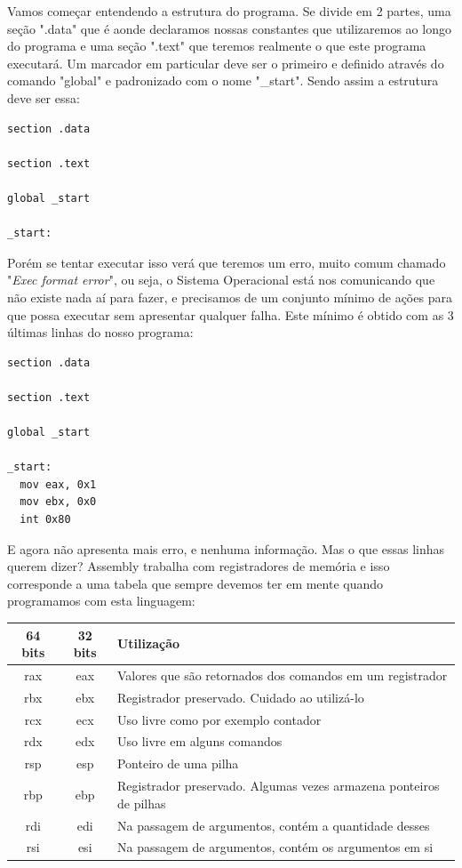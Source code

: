 Vamos começar entendendo a estrutura do programa. Se divide em 2 partes, uma seção ".data" que é aonde declaramos nossas constantes que utilizaremos ao longo do programa e uma seção ".text" que teremos realmente o que este programa executará. Um marcador em particular deve ser o primeiro e definido através do comando "global" e padronizado com o nome "\_start". Sendo assim a estrutura deve ser essa:
\begin{lstlisting}[]
section .data
	
section .text
	
global _start
	
_start:
\end{lstlisting}

Porém se tentar executar isso verá que teremos um erro, muito comum chamado "\textit{Exec format error}", ou seja, o Sistema Operacional está nos comunicando que não existe nada aí para fazer, e precisamos de um conjunto mínimo de ações para que possa executar sem apresentar qualquer falha. Este mínimo é obtido com as 3 últimas linhas do nosso programa:
\begin{lstlisting}[]
section .data

section .text

global _start

_start:
  mov eax, 0x1
  mov ebx, 0x0
  int 0x80
\end{lstlisting}

E agora não apresenta mais erro, e nenhuma informação. Mas o que essas linhas querem dizer? Assembly trabalha com registradores de memória e isso corresponde a uma tabela que sempre devemos ter em mente quando programamos com esta linguagem:
\begin{table}[H]
	\centering 
	\begin{tabular}{c | c | l }
		\textbf{64 bits} & \textbf{32 bits} & \textbf{Utilização} \\ \hline
		rax & eax & Valores que são retornados dos comandos em um registrador \\
		rbx & ebx & Registrador preservado. Cuidado ao utilizá-lo \\
		rcx & ecx & Uso livre como por exemplo contador \\
		rdx & edx & Uso livre em alguns comandos \\
		rsp & esp & Ponteiro de uma pilha \\
		rbp & ebp & Registrador preservado. Algumas vezes armazena ponteiros de pilhas \\
		rdi & edi & Na passagem de argumentos, contém a quantidade desses \\
		rsi & esi & Na passagem de argumentos, contém os argumentos em si \\
	\end{tabular}
\end{table}

